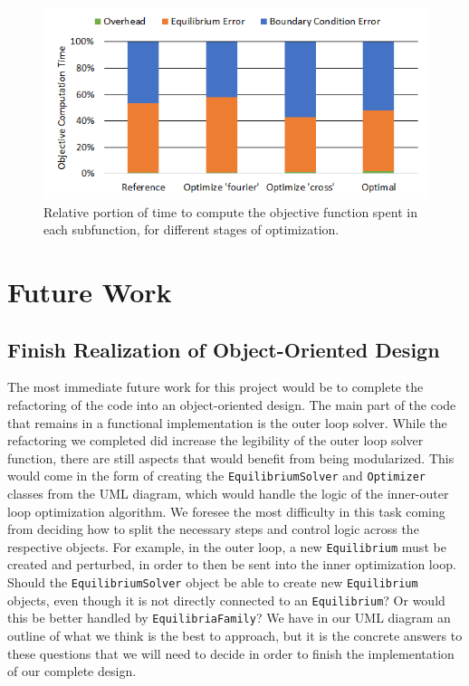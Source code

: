 \documentclass{article}
\begin{document}
%
\begin{figure}[H]
	\centering
	\includegraphics[width=0.6\linewidth,center]{./figs/compute_time_rel.png}
	\caption{Relative portion of time to compute the objective function spent in each subfunction, for different stages of optimization.}
	\label{fig:compute_time_rel}
\end{figure}

\section{Future Work}

\subsection{Finish Realization of Object-Oriented Design}

The most immediate future work for this project would be to complete the refactoring of the code into an object-oriented design.
The main part of the code that remains in a functional implementation is the outer loop solver.
While the refactoring we completed did increase the legibility of the outer loop solver function, there are still aspects that would benefit from being modularized.
This would come in the form of creating the \texttt{EquilibriumSolver} and \texttt{Optimizer} classes from the UML diagram, which would handle the logic of the inner-outer loop optimization algorithm.
We foresee the most difficulty in this task coming from deciding how to split the necessary steps and control logic across the respective objects.
For example, in the outer loop, a new \texttt{Equilibrium} must be created and perturbed, in order to then be sent into the inner optimization loop.
Should the \texttt{EquilibriumSolver} object be able to create new \texttt{Equilibrium} objects, even though it is not directly connected to an \texttt{Equilibrium}?
Or would this be better handled by \texttt{EquilibriaFamily}?
We have in our UML diagram an outline of what we think is the best to approach, but it is the concrete answers to these questions that we will need to decide in order to finish the implementation of our complete design.
\end{document}
